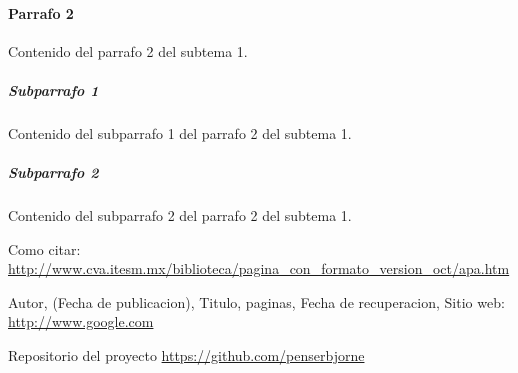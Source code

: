 \documentclass[a4paper,11pt]{article}                 %
\begin{document}
  \paragraph{Parrafo 2}                               %
  Contenido del parrafo 2 del subtema 1.
  
  \subparagraph{Subparrafo 1}                         %
  Contenido del subparrafo 1 del parrafo 2 del subtema 1.
  
  \subparagraph{Subparrafo 2}                         %
  Contenido del subparrafo 2 del parrafo 2 del subtema 1.
  
  
  \begin{appendix}                                    %
    \listoffigures                                    %
    \listoftables                                     %
  \end{appendix}
  
  \begin{thebibliography}{}                           %
      Como citar: \url{http://www.cva.itesm.mx/biblioteca/pagina_con_formato_version_oct/apa.htm} %

      Autor,
      (Fecha de publicacion),
      Titulo, paginas,
      Fecha de recuperacion,
      Sitio web: \url{http://www.google.com}

      Repositorio del proyecto \url{https://github.com/penserbjorne}
  \end{thebibliography}

\end{document}
